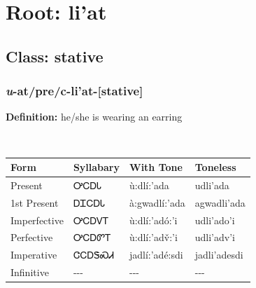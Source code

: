 \needspace{4in}
\section*{Root: li'at}
\nopagebreak
{}
\needspace{3in}
\subsection*{Class: stative}
\nopagebreak
\needspace{2in}
\subsubsection*{\textit{u}{-}at/pre/c{-}\textbf{li'at}{-}[stative]}
\nopagebreak
\textbf{Definition: } he/she is wearing an earring
\\[0.5em]
\begin{tabularx}{\textwidth}{l X X X}%
\toprule%
\textbf{Form}&\textbf{Syllabary}&\textbf{With Tone}&\textbf{Toneless}\\%
\midrule%
Present&ᎤᏟᎠᏓ&ù:dlí:’ada&udli’ada\\%
1st Present&ᎠᏆᏟᎠᏓ&à:gwadlí:’ada&agwadli’ada\\%
Imperfective&ᎤᏟᎠᏙᎢ&ù:dlí:’adó:’i&udli’ado’i\\%
Perfective&ᎤᏟᎠᏛᎢ&ù:dlí:’adv̌:’i&udli’adv’i\\%
Imperative&ᏣᏟᎠᏕᏍᏗ&jadlí:’adé:sdi&jadli’adesdi\\%
Infinitive&{-}{-}{-}&{-}{-}{-}&{-}{-}{-}\\%
\bottomrule%
\end{tabularx}
\\[1em]